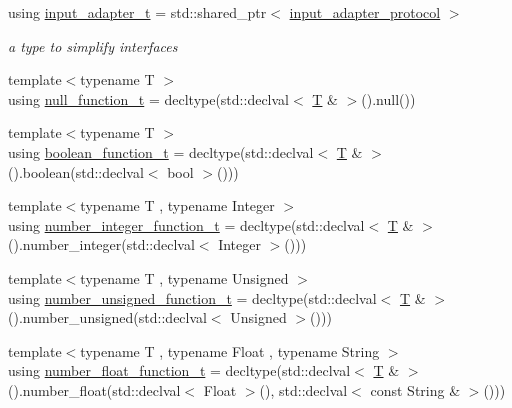 \begin{DoxyCompactItemize}
using \mbox{\hyperlink{namespacenlohmann_1_1detail_ae132f8cd5bb24c5e9b40ad0eafedf1c2}{input\+\_\+adapter\+\_\+t}} = std\+::shared\+\_\+ptr$<$ \mbox{\hyperlink{structnlohmann_1_1detail_1_1input__adapter__protocol}{input\+\_\+adapter\+\_\+protocol}} $>$
\begin{DoxyCompactList}\small\item\em a type to simplify interfaces \end{DoxyCompactList}\item 
{\footnotesize template$<$typename T $>$ }\\using \mbox{\hyperlink{namespacenlohmann_1_1detail_ac1b4e524746bf8b790b2b776048b93c4}{null\+\_\+function\+\_\+t}} = decltype(std\+::declval$<$ \mbox{\hyperlink{_keyboard_event_8h_adf1f3edb9115acb0a1e04209b7a9937b}{T}} \& $>$().null())
\item 
{\footnotesize template$<$typename T $>$ }\\using \mbox{\hyperlink{namespacenlohmann_1_1detail_a45ec87326503b8884b664a9ef23a6c99}{boolean\+\_\+function\+\_\+t}} = decltype(std\+::declval$<$ \mbox{\hyperlink{_keyboard_event_8h_adf1f3edb9115acb0a1e04209b7a9937b}{T}} \& $>$().boolean(std\+::declval$<$ bool $>$()))
\item 
{\footnotesize template$<$typename T , typename Integer $>$ }\\using \mbox{\hyperlink{namespacenlohmann_1_1detail_a4a3e14a011b9ea1ff849fc6d2411e6a0}{number\+\_\+integer\+\_\+function\+\_\+t}} = decltype(std\+::declval$<$ \mbox{\hyperlink{_keyboard_event_8h_adf1f3edb9115acb0a1e04209b7a9937b}{T}} \& $>$().number\+\_\+integer(std\+::declval$<$ Integer $>$()))
\item 
{\footnotesize template$<$typename T , typename Unsigned $>$ }\\using \mbox{\hyperlink{namespacenlohmann_1_1detail_a74da7b17bda76f65d276feb18209c913}{number\+\_\+unsigned\+\_\+function\+\_\+t}} = decltype(std\+::declval$<$ \mbox{\hyperlink{_keyboard_event_8h_adf1f3edb9115acb0a1e04209b7a9937b}{T}} \& $>$().number\+\_\+unsigned(std\+::declval$<$ Unsigned $>$()))
\item 
{\footnotesize template$<$typename T , typename Float , typename String $>$ }\\using \mbox{\hyperlink{namespacenlohmann_1_1detail_ad42df56e913abe26ed556e0e92f386f4}{number\+\_\+float\+\_\+function\+\_\+t}} = decltype(std\+::declval$<$ \mbox{\hyperlink{_keyboard_event_8h_adf1f3edb9115acb0a1e04209b7a9937b}{T}} \& $>$().number\+\_\+float(std\+::declval$<$ Float $>$(), std\+::declval$<$ const String \& $>$()))

\end{DoxyCompactItemize}
